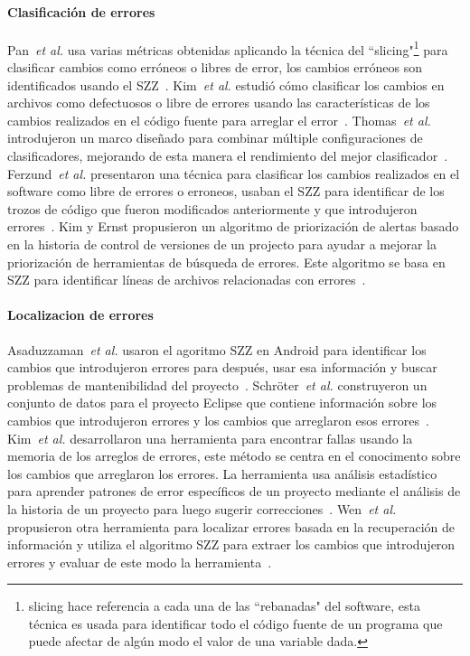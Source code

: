 \documentclass[a4paper, 12pt]{book}
\begin{document}
\paragraph{Clasificaci\'on de errores}
Pan~\textit{et al.} usa varias m\'etricas obtenidas aplicando la t\'ecnica del ``slicing"\footnote{slicing hace referencia a cada una de las ``rebanadas" del software, esta t\'ecnica es usada para identificar todo el c\'odigo fuente de un programa que puede afectar de alg\'un modo el valor de una variable dada.} para clasificar cambios como err\'oneos o libres de error, los cambios err\'oneos son identificados usando el SZZ~\cite{pan2006bug}. Kim~\textit{et al.} estudi\'o c\'omo clasificar los cambios en archivos como defectuosos o libre de errores usando las caracter\'isticas de los cambios realizados en el c\'odigo fuente para arreglar el error~\cite{kim2008classifying}. Thomas~\textit{et al.} introdujeron un marco dise\~nado para combinar m\'ultiple configuraciones de clasificadores, mejorando de esta manera el rendimiento del mejor clasificador~\cite{thomas2013impact}. Ferzund~\textit{et al.} presentaron una t\'ecnica para clasificar los cambios realizados en el software como libre de errores o erroneos, usaban el SZZ para identificar de los trozos de c\'odigo que fueron modificados anteriormente y que introdujeron errores~\cite{ferzund2009software}. Kim y Ernst propusieron un algoritmo de priorizaci\'on de alertas basado en la historia de control de versiones de un projecto para ayudar a mejorar la priorizaci\'on de herramientas de b\'usqueda de errores. Este algoritmo se basa en SZZ para identificar l\'ineas de archivos relacionadas con errores~\cite{kim2007warnings}.

\paragraph{Localizacion de errores}
Asaduzzaman~\emph{et al.} usaron el agoritmo SZZ en Android para identificar los cambios que introdujeron errores para despu\'es, usar esa informaci\'on y buscar problemas de mantenibilidad del proyecto~\cite{asaduzzaman2012bug}. Schr{\"o}ter~\emph{et al.} construyeron un conjunto de datos para el proyecto Eclipse que contiene informaci\'on sobre los cambios que introdujeron errores y los cambios que arreglaron esos errores~\cite{schroter2006if}. Kim~\emph{et al.} desarrollaron una herramienta para encontrar fallas usando la memoria de los arreglos de errores, este m\'etodo se centra en el conocimento sobre los cambios que arreglaron los errores. La herramienta usa an\'alisis estad\'istico para aprender patrones de error espec\'ificos de un proyecto mediante el an\'alisis de la historia de un proyecto para luego sugerir correcciones~\cite{kim2006memories}. Wen~\emph{et al.} propusieron otra herramienta para localizar errores basada en la recuperaci\'on de informaci\'on y utiliza el algoritmo SZZ para extraer los cambios que introdujeron errores y evaluar de este modo la herramienta~\cite{wen2016locus}.
\end{document}
